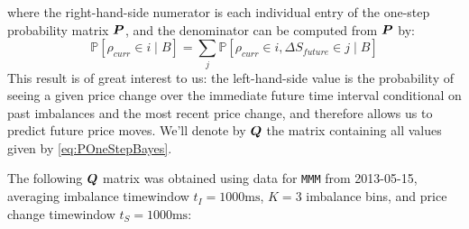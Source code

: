 where the right-hand-side numerator is each individual entry of the one-step probability matrix $\boldsymbol{P}$, and the denominator can be computed from $\boldsymbol{P}$ by:
\begin{equation}\label{eq:POneStepBayesDenom}
\mathbb{P}\left[ \rho_{curr} \in i \; | \; B \right] = \sum\limits_j \mathbb{P}\left[ \rho_{curr} \in i,  \Delta S_{future} \in j \; | \; B \right]
\end{equation}
This result is of great interest to us: the left-hand-side value is the probability of seeing a given price change over the immediate future time interval conditional on past imbalances and the most recent price change, and therefore allows us to predict future price moves. We'll denote by $\boldsymbol{Q}$ the matrix containing all values given by \eqref{eq:POneStepBayes}.

The following $\boldsymbol{Q}$ matrix was obtained using data for \texttt{MMM} from 2013-05-15, averaging imbalance timewindow $t_I = 1000\text{ms}$, $K=3$ imbalance bins, and price change timewindow $t_S = 1000\text{ms}$:
